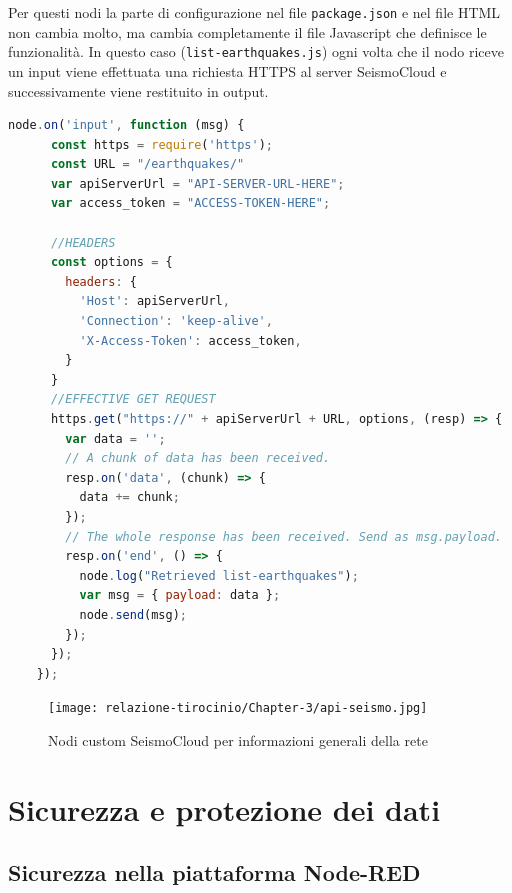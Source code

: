 \documentclass[a4paper,10pt]{memoir}
\begin{document}
Per questi nodi la parte di configurazione nel file \texttt{package.json} e nel file HTML non cambia molto, ma cambia completamente il file Javascript che definisce le funzionalità.
In questo caso (\texttt{list-earthquakes.js}) ogni volta che il nodo riceve un input viene effettuata una richiesta HTTPS al server SeismoCloud e successivamente viene restituito in output.
\begin{lstlisting}[language=Javascript,firstnumber=20]
    node.on('input', function (msg) {
      const https = require('https');
      const URL = "/earthquakes/"
      var apiServerUrl = "API-SERVER-URL-HERE";
      var access_token = "ACCESS-TOKEN-HERE";

      //HEADERS
      const options = {
        headers: {
          'Host': apiServerUrl,
          'Connection': 'keep-alive',
          'X-Access-Token': access_token,
        }
      }
      //EFFECTIVE GET REQUEST
      https.get("https://" + apiServerUrl + URL, options, (resp) => {
        var data = '';
        // A chunk of data has been received.
        resp.on('data', (chunk) => {
          data += chunk;
        });
        // The whole response has been received. Send as msg.payload.
        resp.on('end', () => {
          node.log("Retrieved list-earthquakes");
          var msg = { payload: data };
          node.send(msg);
        });
      });
    });
\end{lstlisting}

\begin{figure}[ht]
    \texttt{[image: relazione-tirocinio/Chapter-3/api-seismo.jpg]}
    \caption{Nodi custom SeismoCloud per informazioni generali della rete}
    \label{fig:api-seismo-nodes}
\end{figure}


\chapter{Sicurezza e protezione dei dati}

\section{Sicurezza nella piattaforma Node-RED}
\end{document}
